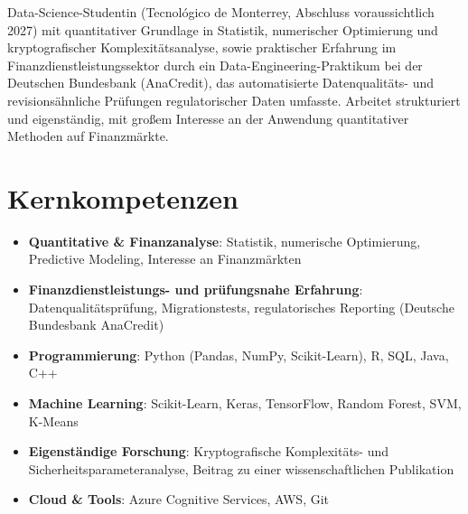 \documentclass[11pt,a4paper,sans]{moderncv}
\begin{document}
\makecvtitle


\vspace{6pt}
\small{Data-Science-Studentin (Tecnológico de Monterrey, Abschluss voraussichtlich 2027) mit quantitativer Grundlage in Statistik, numerischer Optimierung und kryptografischer Komplexitätsanalyse, sowie praktischer Erfahrung im Finanzdienstleistungssektor durch ein Data-Engineering-Praktikum bei der Deutschen Bundesbank (AnaCredit), das automatisierte Datenqualitäts- und revisionsähnliche Prüfungen regulatorischer Daten umfasste. Arbeitet strukturiert und eigenständig, mit großem Interesse an der Anwendung quantitativer Methoden auf Finanzmärkte.}


\section{Kernkompetenzen}
\vspace{1pt}
\begin{itemize}

\item \textbf{Quantitative \& Finanzanalyse}: Statistik, numerische Optimierung, Predictive Modeling, Interesse an Finanzmärkten

\item \textbf{Finanzdienstleistungs- und prüfungsnahe Erfahrung}: Datenqualitätsprüfung, Migrationstests, regulatorisches Reporting (Deutsche Bundesbank AnaCredit)

\item \textbf{Programmierung}: Python (Pandas, NumPy, Scikit-Learn), R, SQL, Java, C++

\item \textbf{Machine Learning}: Scikit-Learn, Keras, TensorFlow, Random Forest, SVM, K-Means

\item \textbf{Eigenständige Forschung}: Kryptografische Komplexitäts- und Sicherheitsparameteranalyse, Beitrag zu einer wissenschaftlichen Publikation

\item \textbf{Cloud \& Tools}: Azure Cognitive Services, AWS, Git

\end{itemize}
\end{document}
